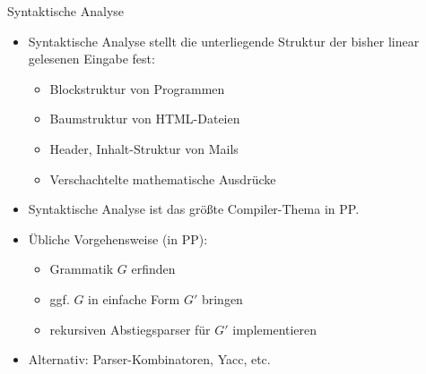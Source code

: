 \documentclass{beamer}
\begin{document}
\begin{frame}{Syntaktische Analyse}
	\begin{itemize}
		\item Syntaktische Analyse stellt die unterliegende Struktur der bisher linear gelesenen Eingabe fest:
		\begin{itemize}
			\item Blockstruktur von Programmen
			\item Baumstruktur von HTML-Dateien
			\item Header, Inhalt-Struktur von Mails
			\item Verschachtelte mathematische Ausdrücke
		\end{itemize}
		\item Syntaktische Analyse ist das größte Compiler-Thema in PP.
		\pause
		\item Übliche Vorgehensweise (in PP):
		\begin{itemize}
			\item Grammatik $G$ erfinden
			\item ggf. $G$ in einfache Form $G'$ bringen
			\item rekursiven Abstiegsparser für $G'$ implementieren
		\end{itemize}
		\item Alternativ: Parser-Kombinatoren, Yacc, etc.
	\end{itemize}
\end{frame}
\end{document}

